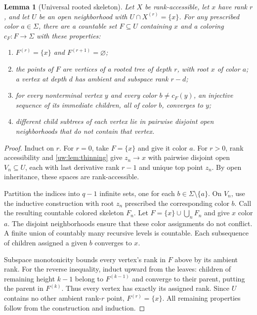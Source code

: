 \documentclass[11pt,letterpaper]{article}
\numberwithin{equation}{section}
\newtheorem{lemma}[lemma]{Lemma}
\theoremstyle{definition}
\theoremstyle{remark}
\theoremstyle{definition}
\begin{document}
\begin{lemma}[Universal rooted skeleton]\label{uw:lem:skeleton}
Let $X$ be rank-accessible, let $x$ have rank $r$, and let $U$ be an open
neighborhood with $U\cap X^{(r)}=\{x\}$. For any prescribed color
$a\in\Sigma$, there are a countable set $F\subseteq U$ containing $x$ and
a coloring $c_F:F\to\Sigma$ with these properties:
\begin{enumerate}[label=\textup{(\roman*)}]
\item $F^{(r)}=\{x\}$ and $F^{(r+1)}=\varnothing$;
\item the points of $F$ are vertices of a rooted tree of depth $r$, with root
$x$ of color $a$; a vertex at depth $d$ has ambient and subspace rank $r-d$;
\item for every nonterminal vertex $y$ and every color $b\ne c_F(y)$, an
injective sequence of its immediate children, all of color $b$, converges to
$y$;
\item different child subtrees of each vertex lie in pairwise disjoint open
neighborhoods that do not contain that vertex.
\end{enumerate}
\end{lemma}
\begin{proof}
Induct on $r$. For $r=0$, take $F=\{x\}$ and give it color $a$.
For $r>0$, rank accessibility and \cref{uw:lem:thinning} give
$z_n\to x$ with pairwise disjoint open $V_n\subseteq U$, each with
last derivative rank $r-1$ and unique top point $z_n$. By open inheritance,
these spaces are rank-accessible.

Partition the indices into $q-1$ infinite sets, one for each
$b\in\Sigma\setminus\{a\}$. On $V_n$, use the inductive construction with
root $z_n$ prescribed the corresponding color $b$. Call the resulting
countable colored skeleton $F_n$. Let
$F=\{x\}\cup\bigcup_n F_n$ and give $x$ color $a$. The disjoint
neighborhoods ensure that these color assignments do not conflict. A finite
union of countably many recursive levels is countable. Each subsequence of
children assigned a given $b$ converges to $x$.

Subspace monotonicity bounds every vertex's rank in $F$ above by its ambient
rank. For the reverse inequality, induct upward from the leaves: children
of remaining height $k-1$ belong to $F^{(k-1)}$ and converge to their parent,
putting the parent in $F^{(k)}$. Thus every vertex has exactly its assigned
rank. Since $U$ contains no other ambient rank-$r$ point, $F^{(r)}=\{x\}$.
All remaining properties follow from the construction and induction.
\end{proof}
\end{document}
